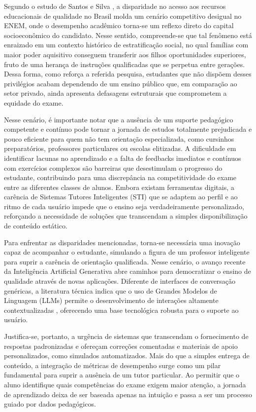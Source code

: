 \documentclass[12pt]{article}
\begin{document}
Segundo o estudo de Santos e Silva \cite{latitude2023}, a disparidade no acesso aos recursos educacionais de qualidade no Brasil molda um cenário competitivo desigual no ENEM, onde o desempenho acadêmico torna-se um reflexo direto do capital socioeconômico do candidato. Nesse sentido, compreende-se que tal fenômeno está enraizado em um contexto histórico de estratificação social, no qual famílias com maior poder aquisitivo conseguem transferir aos filhos oportunidades superiores, fruto de uma herança de instruções qualificadas que se perpetua entre gerações. Dessa forma, como reforça a referida pesquisa, estudantes que não dispõem desses privilégios acabam dependendo de um ensino público que, em comparação ao setor privado, ainda apresenta defasagens estruturais que comprometem a equidade do exame.

Nesse cenário, é importante notar que a ausência de um suporte pedagógico competente e contínuo pode tornar a jornada de estudos totalmente prejudicada e pouco eficiente para quem não tem orientação especializada, como cursinhos preparatórios, professores particulares ou escolas elitizadas. A dificuldade em identificar lacunas no aprendizado e a falta de feedbacks imediatos e contínuos com exercícios complexos são barreiras que desestimulam o progresso do estudante, contribuindo para uma discrepância na competitividade do exame entre as diferentes classes de alunos. Embora existam ferramentas digitais, a carência de Sistemas Tutores Inteligentes (STI) que se adaptem ao perfil e ao ritmo de cada usuário \cite{unicamp2022} impede que o ensino seja verdadeiramente personalizado, reforçando a necessidade de soluções que transcendam a simples disponibilização de conteúdo estático.

Para enfrentar as disparidades mencionadas, torna-se necessária uma inovação capaz de acompanhar o estudante, simulando a figura de um professor inteligente para suprir a carência de orientação qualificada. Nesse cenário, o avanço recente da Inteligência Artificial Generativa abre caminhos para democratizar o ensino de qualidade através de novas aplicações. Diferente de interfaces de conversação genéricas, a literatura técnica indica que o uso de Grandes Modelos de Linguagem (LLMs) permite o desenvolvimento de interações altamente contextualizadas \cite{sbc2024}, oferecendo uma base tecnológica robusta para o suporte ao usuário.

Justifica-se, portanto, a urgência de sistemas que transcendam o fornecimento de respostas padronizadas e ofereçam correções comentadas e materiais de apoio personalizados, como simulados automatizados. Mais do que a simples entrega de conteúdo, a integração de métricas de desempenho surge como um pilar fundamental para suprir a ausência de um tutor particular. Ao permitir que o aluno identifique quais competências do exame exigem maior atenção, a jornada de aprendizado deixa de ser baseada apenas na intuição e passa a ser um processo guiado por dados pedagógicos.
\end{document}
